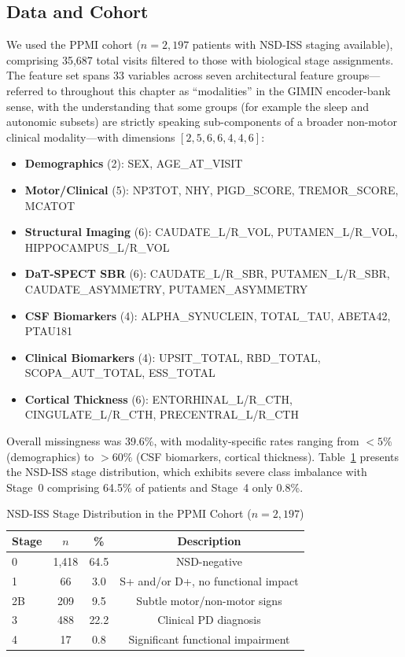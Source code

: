 \subsection{Data and Cohort}
\label{p2:sec:data}

We used the PPMI cohort ($n = 2{,}197$ patients with NSD-ISS staging available), comprising 35,687 total visits filtered to those with biological stage assignments. The feature set spans 33 variables across seven architectural feature groups---referred to throughout this chapter as ``modalities'' in the GIMIN encoder-bank sense, with the understanding that some groups (for example the sleep and autonomic subsets) are strictly speaking sub-components of a broader non-motor clinical modality---with dimensions $[2, 5, 6, 6, 4, 4, 6]$:

\begin{itemize}
    \item \textbf{Demographics} (2): SEX, AGE\_AT\_VISIT
    \item \textbf{Motor/Clinical} (5): NP3TOT, NHY, PIGD\_SCORE, TREMOR\_SCORE, MCATOT
    \item \textbf{Structural Imaging} (6): CAUDATE\_L/R\_VOL, PUTAMEN\_L/R\_VOL, HIPPOCAMPUS\_L/R\_VOL
    \item \textbf{DaT-SPECT SBR} (6): CAUDATE\_L/R\_SBR, PUTAMEN\_L/R\_SBR, CAUDATE\_ASYMMETRY, PUTAMEN\_ASYMMETRY
    \item \textbf{CSF Biomarkers} (4): ALPHA\_SYNUCLEIN, TOTAL\_TAU, ABETA42, PTAU181
    \item \textbf{Clinical Biomarkers} (4): UPSIT\_TOTAL, RBD\_TOTAL, SCOPA\_AUT\_TOTAL, ESS\_TOTAL
    \item \textbf{Cortical Thickness} (6): ENTORHINAL\_L/R\_CTH, CINGULATE\_L/R\_CTH, PRECENTRAL\_L/R\_CTH
\end{itemize}

Overall missingness was 39.6\%, with modality-specific rates ranging from $<5\%$ (demographics) to $>60\%$ (CSF biomarkers, cortical thickness). Table~\ref{p2:tab:stage_dist} presents the NSD-ISS stage distribution, which exhibits severe class imbalance with Stage~0 comprising 64.5\% of patients and Stage~4 only 0.8\%.

\begin{table}[!t]
\caption{NSD-ISS Stage Distribution in the PPMI Cohort ($n = 2{,}197$)}
\label{p2:tab:stage_dist}
\centering
\footnotesize
\begin{tabular}{@{}lccc@{}}
\toprule
\textbf{Stage} & \textbf{$n$} & \textbf{\%} & \textbf{Description} \\
\midrule
0 & 1,418 & 64.5 & NSD-negative \\
1 & 66 & 3.0 & S+ and/or D+, no functional impact \\
2B & 209 & 9.5 & Subtle motor/non-motor signs \\
3 & 488 & 22.2 & Clinical PD diagnosis \\
4 & 17 & 0.8 & Significant functional impairment \\
\bottomrule
\end{tabular}
\end{table}

